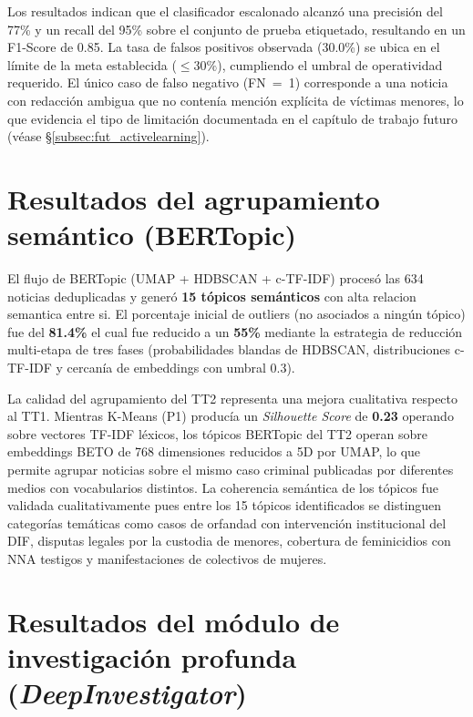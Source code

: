 \vspace{0.4cm}
\noindent
Los resultados indican que el clasificador escalonado alcanzó una precisión
del 77\% y un recall del 95\% sobre el conjunto de prueba etiquetado,
resultando en un F1-Score de 0.85. La tasa de falsos positivos observada
(30.0\%) se ubica en el límite de la meta establecida ($\leq 30\%$),
cumpliendo el umbral de operatividad requerido. El único caso de falso
negativo (FN~=~1) corresponde a una noticia con redacción ambigua que no
contenía mención explícita de víctimas menores, lo que evidencia el tipo
de limitación documentada en el capítulo de trabajo futuro
(véase \S\ref{subsec:fut_activelearning}).

\section{Resultados del agrupamiento semántico (BERTopic)}
\label{sec:res_agrupamiento}


El flujo de BERTopic (UMAP + HDBSCAN + c-TF-IDF) procesó las 634 noticias deduplicadas
y generó \textbf{15 tópicos semánticos} con alta relacion semantica entre si. El porcentaje inicial
de outliers (no asociados a ningún tópico) fue del \textbf{81.4\%} el cual fue reducido a un \textbf{55\%}
mediante la estrategia de reducción multi-etapa de tres fases (probabilidades blandas de HDBSCAN,
distribuciones c-TF-IDF y cercanía de embeddings con umbral 0.3).

La calidad del agrupamiento del TT2 representa una mejora cualitativa respecto al TT1.
Mientras K-Means (P1) producía un \textit{Silhouette Score} de \textbf{0.23} operando
sobre vectores TF-IDF léxicos, los tópicos BERTopic del TT2 operan sobre embeddings BETO
de 768 dimensiones reducidos a 5D por UMAP, lo que permite agrupar noticias sobre el mismo
caso criminal publicadas por diferentes medios con vocabularios distintos. La coherencia semántica
de los tópicos fue validada cualitativamente pues entre los 15 tópicos identificados se
distinguen categorías temáticas como casos de orfandad con intervención institucional
del DIF, disputas legales por la custodia de menores, cobertura de feminicidios con
NNA testigos y manifestaciones de colectivos de mujeres.

\section{Resultados del módulo de investigación profunda (\textit{DeepInvestigator})}
\label{sec:res_investigador}

